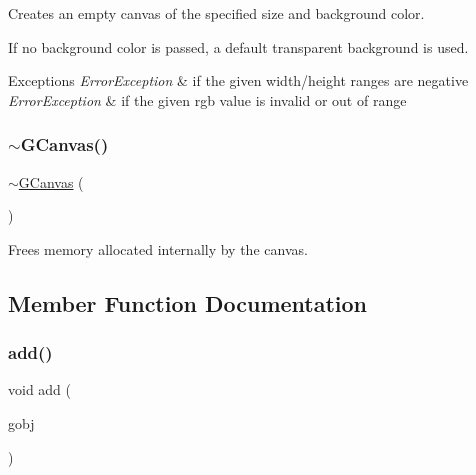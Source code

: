 Creates an empty canvas of the specified size and background color. 

If no background color is passed, a default transparent background is used. 
\begin{DoxyExceptions}{Exceptions}
{\em Error\+Exception} & if the given width/height ranges are negative \\
\hline
{\em Error\+Exception} & if the given rgb value is invalid or out of range \\
\hline
\end{DoxyExceptions}
\mbox{\label{classGCanvas_af7574c14a3a729c56863e9c4ab6a6787}} 
\subsubsection{\texorpdfstring{$\sim$\+G\+Canvas()}{~GCanvas()}}
{\footnotesize\ttfamily $\sim$\mbox{\hyperlink{classGCanvas}{G\+Canvas}} (\begin{DoxyParamCaption}{ }\end{DoxyParamCaption})\hspace{0.3cm}{\ttfamily [override]}}



Frees memory allocated internally by the canvas. 



\subsection{Member Function Documentation}
\mbox{\label{classGCanvas_afe8277e7b2627513c6f7452fb0b2847d}} 
\subsubsection{\texorpdfstring{add()}{add()}\hspace{0.1cm}{\footnotesize\ttfamily [1/4]}}
{\footnotesize\ttfamily void add (\begin{DoxyParamCaption}\item[{\mbox{\hyperlink{classGObject}{G\+Object}} $\ast$}]{gobj }\end{DoxyParamCaption})\hspace{0.3cm}{\ttfamily [virtual]}}



